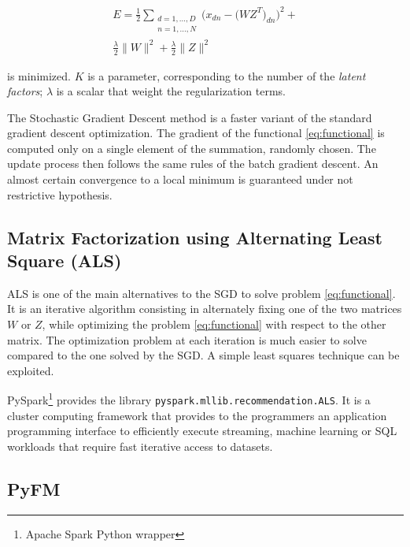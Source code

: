 \documentclass[10pt,conference,compsocconf]{IEEEtran}
\begin{document}
\begin{multline}
\label{eq:functional}
E = \frac{1}{2} \sum_{\substack{d=1,...,D \\n=1,...,N}} 
\bigg( x_{dn} - \big( WZ^T \big)_{dn} \bigg) ^2 + \\ 
\frac{\lambda}{2}\|W\|^2 + \frac{\lambda}{2}\|Z\|^2
\end{multline} 

is minimized. $K$ is a parameter,
corresponding to the number of the \textit{latent factors}; $\lambda$ is a scalar 
that weight the regularization terms.

The Stochastic Gradient Descent method is a faster variant of the standard gradient descent
optimization. The gradient of the functional \ref{eq:functional} is computed only on a single
element of the summation, randomly chosen. The update process then follows the same rules of the batch
gradient descent.
An almost certain convergence to a local minimum is guaranteed under not restrictive hypothesis.

\subsection{Matrix Factorization using Alternating Least Square (ALS)}
ALS is one of the main alternatives to the SGD to solve problem \ref{eq:functional}.
It is an iterative algorithm consisting in alternately fixing one of the two matrices $W$ or $Z$,
while optimizing the problem \ref{eq:functional} with respect to the other matrix.
The optimization problem at each iteration is much easier to solve compared to the one solved by the
SGD. A simple least squares technique can be exploited.

PySpark\footnote{Apache Spark Python wrapper} provides the library \texttt{pyspark.mllib.recommendation.ALS}. It
is a cluster computing framework that provides to the programmers an application programming
interface to efficiently execute streaming, machine learning or SQL workloads that require fast
iterative access to datasets.

\subsection{PyFM}

\end{document}
